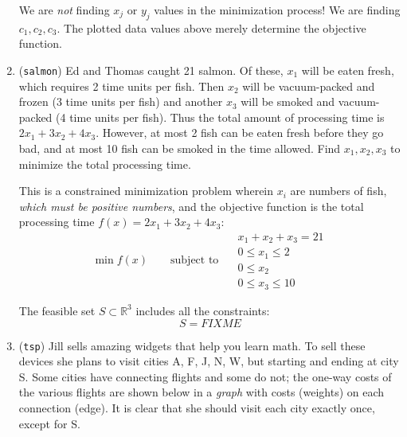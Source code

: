 \documentclass[11pt]{amsart}
\newcommand{\RR}{\mathbb{R}}
\begin{document}
\begin{enumerate}
We are \emph{not} finding $x_j$ or $y_j$ values in the minimization process!  We are finding $c_1,c_2,c_3$.  The plotted data values above merely determine the objective function.

\medskip
\item (\texttt{salmon})  \quad Ed and Thomas caught 21 salmon.  Of these, $x_1$ will be eaten fresh, which requires 2 time units per fish.  Then $x_2$ will be vacuum-packed and frozen (3 time units per fish) and another $x_3$ will be smoked and vacuum-packed (4 time units per fish).  Thus the total amount of processing time is $2 x_1 + 3 x_2 + 4 x_3$.  However, at most 2 fish can be eaten fresh before they go bad, and at most 10 fish can be smoked in the time allowed.  Find $x_1,x_2,x_3$ to minimize the total processing time.

This is a constrained minimization problem wherein $x_i$ are numbers of fish, \emph{which must be positive numbers}, and the objective function is the total processing time $f(x) = 2 x_1 + 3 x_2 + 4 x_3$:
	$$\min f(x) \qquad \text{subject to }\quad \begin{matrix} x_1 + x_2 + x_3 = 21 \\ 0 \le x_1 \le 2 \\ 0 \le x_2 \\ 0 \le x_3 \le 10 \end{matrix}$$

The feasible set $S\subset \RR^3$ includes all the constraints:
    $$S = FIXME$$

\medskip
\item (\texttt{tsp})  \quad Jill sells amazing widgets that help you learn math.  To sell these devices she plans to visit cities A, F, J, N, W, but starting and ending at city S.  Some cities have connecting flights and some do not; the one-way costs of the various flights are shown below in a \emph{graph} with costs (weights) on each connection (edge).  It is clear that she should visit each city exactly once, except for S.

\begin{center}
\vspace{-5mm}
\end{center}
\end{enumerate}
\end{document}
